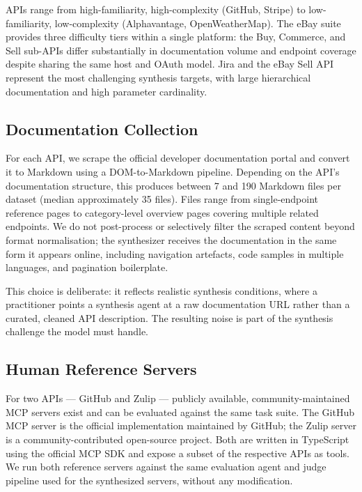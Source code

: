 \documentclass[12pt]{report}
\begin{document}
APIs range from high-familiarity, high-complexity (GitHub, Stripe) to
low-familiarity, low-complexity (Alphavantage, OpenWeatherMap). The eBay
suite provides three difficulty tiers within a single platform: the Buy,
Commerce, and Sell sub-APIs differ substantially in documentation volume and
endpoint coverage despite sharing the same host and OAuth model. Jira and
the eBay Sell API represent the most challenging synthesis targets, with large
hierarchical documentation and high parameter cardinality.

\subsection{Documentation Collection}

For each API, we scrape the official developer documentation portal and convert
it to Markdown using a DOM-to-Markdown pipeline. Depending on the API's
documentation structure, this produces between 7 and 190 Markdown files per
dataset (median approximately 35 files). Files range from single-endpoint
reference pages to category-level overview pages covering multiple related
endpoints. We do not post-process or selectively filter the scraped content
beyond format normalisation; the synthesizer receives the documentation in the
same form it appears online, including navigation artefacts, code samples in
multiple languages, and pagination boilerplate.

This choice is deliberate: it reflects realistic synthesis conditions, where
a practitioner points a synthesis agent at a raw documentation URL rather than
a curated, cleaned API description. The resulting noise is part of the
synthesis challenge the model must handle.

\subsection{Human Reference Servers}

For two APIs --- GitHub and Zulip --- publicly available, community-maintained
MCP servers exist and can be evaluated against the same task suite. The GitHub
MCP server is the official implementation maintained by GitHub; the Zulip
server is a community-contributed open-source project. Both are written in
TypeScript using the official MCP SDK and expose a subset of the respective
APIs as tools. We run both reference servers against the same evaluation agent
and judge pipeline used for the synthesized servers, without any modification.
\end{document}
